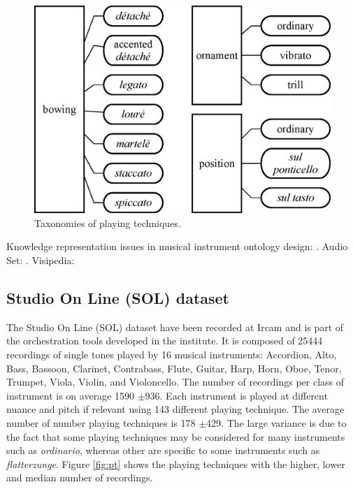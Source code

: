 \documentclass{article}
\begin{document}
\begin{figure}
\centering
\includegraphics[width=\linewidth]{./figs/dendrograms/technique-dendrogram.eps}
\caption{Taxonomies of playing techniques.}
\label{fig:technique-dendrogram}
\end{figure}

Knowledge representation issues in musical instrument ontology design: \cite{kolozali2011ismir}.
Audio Set: \cite{gemmeke2017icassp}.
Visipedia: \cite{belongie2015pattern}



\subsection{Studio On Line (SOL) dataset}


The Studio On Line (SOL) dataset have been recorded at Ircam and is part of the orchestration tools developed in the institute. It is composed of 25444 recordings of single tones played by 16 musical instruments: Accordion, Alto, Bass, Bassoon, Clarinet, Contrabass, Flute, Guitar, Harp, Horn, Oboe, Tenor, Trumpet, Viola, Violin, and Violoncello. The number of recordings per class of instrument is on average 1590 $\pm$936.  Each instrument is played at different nuance and pitch if relevant using 143 different playing technique. The average number of number playing techniques is 178 $\pm$429. The large variance is due to the fact that some playing techniques may be considered for many instruments such as \textit{ordinario}, whereas other are specific to some instruments such as \textit{flatterzunge}. Figure \ref{fig:pt} shows the playing techniques with the higher, lower and median number of recordings.
\end{document}
